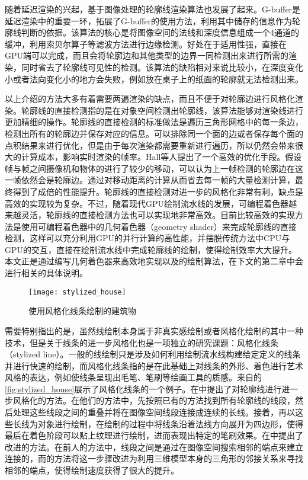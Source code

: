 随着延迟渲染的兴起，基于图像处理的轮廓线渲染算法也发展了起来。G-buffer是延迟渲染中的重要一环，\citeauthor{decaudin1996cartoon}\cite{decaudin1996cartoon}拓展了G-buffer的使用方法，利用其中储存的信息作为轮廓线判断的依据。该算法的核心是将图像空间的法线和深度信息组成一个4通道的缓冲，利用索贝尔算子\cite{gao2010improved}等滤波方法进行边缘检测。好处在于适用性强，直接在GPU端可以完成，而且会将轮廓边和其他类型的边界一同检测出来进行所需的渲染，同时省去了轮廓线可见性的检测。该算法的缺陷相对来说比较小，在深度变化小或者法向变化小的地方会失败，例如放在桌子上的纸面的轮廓就无法检测出来。

以上介绍的方法大多有着需要两遍渲染的缺点，而且不便于对轮廓边进行风格化渲染。轮廓线的直接检测指的是在对象空间检测出轮廓线，该算法能够对渲染线进行更加精细的操作。轮廓线的直接检测的标准做法是遍历三角形网格中的每一条边，检测出所有的轮廓边并保存对应的信息\cite{marshall2001cartoon}。可以排除同一个面的边或者保存每个面的点积结果来进行优化，但是由于每次渲染都需要重新进行遍历，所以仍然会带来很大的计算成本，影响实时渲染的帧率。Hall等人提出了一个高效的优化手段\cite{decaudin1996cartoon}。假设帧与帧之间摄像机和物体的进行了较少的移动，可以认为上一帧检测的轮廓边在这一帧依然会是轮廓边。通过对移动距离的计算从而省去每一帧的大量检测计算，最终得到了成倍的性能提升。轮廓线的直接检测对进一步的风格化非常有利，缺点是高效的实现较为复杂。不过，随着现代GPU绘制流水线的发展，可编程着色器越来越灵活，轮廓线的直接检测方法也可以实现地非常高效。目前比较高效的实现方法是使用可编程着色器中的几何着色器（geometry shader）来完成轮廓线的直接检测，这样可以充分利用GPU的并行计算的高性能，并摆脱传统方法中CPU与GPU的交互，直接在绘制流水线中完成轮廓线的绘制，使得绘制效率大大提升。本文正是通过编写几何着色器来高效地实现\con{}以及\scon{}的绘制算法，在下文的第二章中会进行相关的具体说明。

\begin{figure}[tbh]
    \centering
    \texttt{[image: stylized\_house]}
    \caption{\label{fig:stylized_house}
    使用风格化线条绘制的建筑物}
\end{figure}

需要特别指出的是，虽然线绘制本身属于非真实感绘制或者风格化绘制的其中一种技术，但是关于线条的进一步风格化也是一项独立的研究课题：风格化线条（stylized line）。一般的线绘制只是涉及如何利用绘制流水线构建给定定义的线条并进行快速的绘制，而风格化线条指的是在此基础上对线条的外形、着色进行艺术风格的表达，例如使线条呈现出毛笔、笔刷等绘画工具的质感。来自\cite{northrup2000artistic}的\autoref{fig:stylized_house}展示了风格化线条的一个例子。\citeauthor{northrup2000artistic}在\cite{northrup2000artistic}中提出了对轮廓线进行进一步风格化的方法。在他们的方法中，先按照已有的方法找到所有轮廓线的线段，然后处理这些线段之间的重叠并将在图像空间线段连接成连续的长线。接着，再以这些长线为对象进行绘制，在绘制的过程中将线条沿着法线方向展开为四边形，使得最后在着色阶段可以贴上纹理进行绘制，进而表现出特定的笔刷效果。\citeauthor{isenberg2002stylizing}在\cite{isenberg2002stylizing}中提出了改进的方法。在前人的方法中，线段之间是通过在图像空间搜索相邻的端点来建立连接的，而\citeauthor{isenberg2002stylizing}的方法将这一步骤改进为利用三维模型本身的三角形的邻接关系来寻找相邻的端点，使得绘制速度获得了很大的提升。

